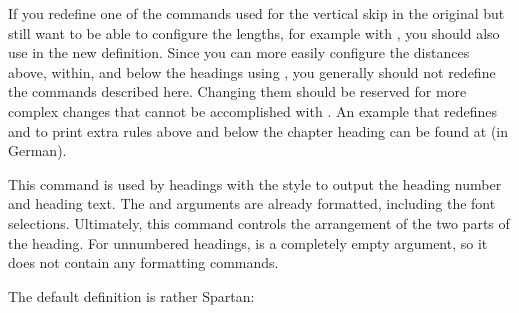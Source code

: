 If you redefine one of the commands used for the vertical skip in the original
 but still want to be able to configure the lengths, for
example with , you should also
use  in the new definition.
Since you can more easily configure the distances above, within,
and below the headings using ,
you generally should not redefine the commands described here. Changing them
should be reserved for more complex changes that cannot be accomplished with
. An
example that redefines  and
 to print extra rules above and below the chapter
heading can be found at \cite{homepage} (in German).%
%
\EndIndexGroup


\begin{Declaration}
\end{Declaration}
This command is used by headings with the  style to
output the heading number and heading text. The  and
 arguments are already formatted, including the font
selections. Ultimately, this command controls the arrangement of the two parts
of the heading. For unnumbered headings,  is a completely empty
argument, so it does not contain any formatting commands.

The default definition is rather Spartan:
\begin{lstcode}
  \newcommand{\partlineswithprefixformat}[3]{%
    #2#3%
  }
\end{lstcode}


